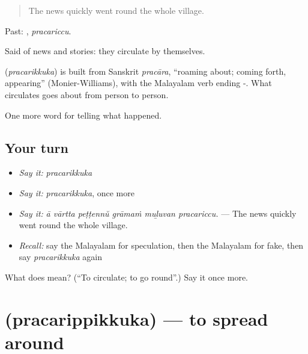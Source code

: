 \begin{quote}
The news quickly went round the whole village.
\end{quote}

Past: , \emph{pracariccu}.

Said of news and stories: they circulate by themselves.

\begin{cousinweb}
\textbf{} (\emph{pracarikkuka}) is built from Sanskrit \emph{pracāra}, \textquotedblleft{}roaming about; coming forth, appearing\textquotedblright{} (Monier-Williams), with the Malayalam verb ending -. What circulates goes about from person to person.
\end{cousinweb}

\begin{grammarlens}[title={What you've built}]
One more word for telling what happened.
\end{grammarlens}

\subsection*{Your turn}
\begin{itemize}
\raggedright
  \item \emph{Say it:} \emph{pracarikkuka}
  \item \emph{Say it:} \emph{pracarikkuka}, once more
  \item \emph{Say it:} \emph{ā vārtta peṭṭennŭ grāmaṁ muḻuvan pracariccu.} — The news quickly went round the whole village.
  \item \emph{Recall:} say the Malayalam for speculation, then the Malayalam for fake, then say \emph{pracarikkuka} again
\end{itemize}

\begin{tcolorbox}[breakable,colback=teal!4,colframe=teal!35!black,title={Before you move on}]
What does  mean? (\textquotedblleft{}To circulate; to go round\textquotedblright{}.) Say it once more.
\end{tcolorbox}
\section[\texorpdfstring{\ml{പ്രചരിപ്പിക്കുക} (pracarippikkuka)}{പ്രചരിപ്പിക്കുക (pracarippikkuka)}]{ (pracarippikkuka) — to spread around}

\label{lesson:ML-C353-pracarippikkuka}



